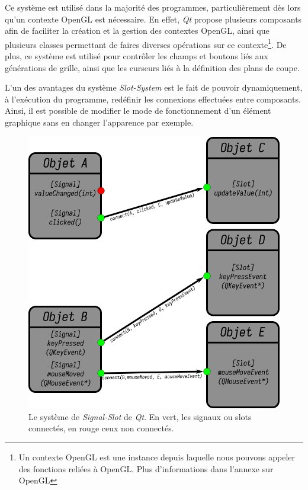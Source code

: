 Ce système est utilisé dans la majorité des programmes, particulièrement dès lors qu'un contexte OpenGL est nécessaire. En effet, \textit{Qt} propose plusieurs composants afin de faciliter la création et la gestion des contextes OpenGL, ainsi que plusieurs classes permettant de faires diverses opérations sur ce contexte\footnote{Un contexte OpenGL est une instance depuis laquelle nous pouvons appeler des fonctions reliées à OpenGL. Plus d'informations dans l'annexe sur OpenGL}. De plus, ce système est utilisé pour contrôler les champs et boutons liés aux générations de grille, ainsi que les curseurs liés à la définition des plans de coupe.

L'un des avantages du système \textit{Slot-System} est le fait de pouvoir dynamiquement, à l'exécution du programme, redéfinir les connexions effectuées entre composants. Ainsi, il est possible de modifier le mode de fonctionnement d'un élément graphique sans en changer l'apparence par exemple.

\begin{figure}[ht]
    \centering
    \includegraphics[width=.8\linewidth]{img/qt_slot_signal_diagram.png}
    \captionsetup{width=.8\textwidth}
    \caption{Le système de \textit{Signal-Slot} de \textit{Qt}. En vert, les signaux ou slots connectés, en rouge ceux non connectés.}
    \label{img:qt:signal_slot_diagram}
\end{figure}
